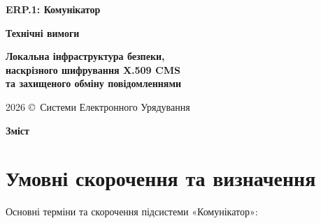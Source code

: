 \documentclass{article}
\newcommand\HUGE[1]{\fontsize{38}{38}\selectfont #1}
\begin{document}
\pagestyle{fancy}

\begin{titlepage}
\AddToShipoutPictureBG*{\AtPageLowerLeft{\color{primary}\rule{\paperwidth}{\paperheight}}}
\color{white}\thispagestyle{empty}\vspace*{4cm}\centering
  {\Huge \textbf{ERP.1: Комунікатор} \par} \vspace{2cm}
  {\HUGE \textbf{Технічні вимоги} \par} \vspace{2.5cm}
  {\LARGE \textbf{Локальна інфраструктура безпеки, \\ наскрізного шифрування X.509 CMS \\ та захищеного обміну повідомленнями} \par} \vspace{2.5cm}
\vfill
  {\large 2026 \copyright\ Системи Електронного Урядування \par}
\end{titlepage}

\newpage
\begin{center}
  {\Huge\color{primary}\bfseries Зміст\par}
\end{center}
\vspace{40pt}
\tableofcontents

\newpage
\begin{abstract}
У цьому документі наведено детальні технічні вимоги до підсистеми ERP.1: Комунікатор, яка розробляється як надійна, децентралізована, стійка до відмов платформа безпечного обміну повідомленнями (чат v2) та документами (пошта v3) у захищеному периферійному контурі підприємства чи установи. Система базується на принципах наскрізного шифрування X.509 CMS, кодуванні повідомлень у форматі ASN.1 DER та транспортному протоколі Buddha (X.422). Вона абсорбує існуючі сервіси авторизації, видачі сертифікатів (CA), захищених тунелів (VPN), служби каталогів (LDAP) та забезпечує повну функціональну сумісність без використання екосистеми Rust.
\end{abstract}

\newpage
\section{Умовні скорочення та визначення}

Основні терміни та скорочення підсистеми «Комунікатор»:
\end{document}
